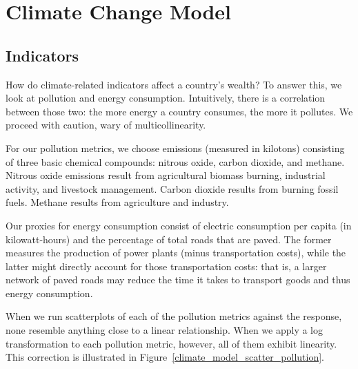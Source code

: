\documentclass[12pt]{article}
\begin{document}
\section{Climate Change Model}

\subsection{Indicators}
How do climate-related indicators affect a country's wealth? To answer this, we look at pollution and energy consumption. Intuitively, there is a correlation between those two: the more energy a country consumes, the more it pollutes. We proceed with caution, wary of multicollinearity.

For our pollution metrics, we choose emissions (measured in kilotons) consisting of three basic chemical compounds: nitrous oxide, carbon dioxide, and methane. Nitrous oxide emissions result from agricultural biomass burning, industrial activity, and livestock management. Carbon dioxide results from burning fossil fuels. Methane results from agriculture and industry.

Our proxies for energy consumption consist of electric consumption per capita (in kilowatt-hours) and the percentage of total roads that are paved. The former measures the production of power plants (minus transportation costs), while the latter might directly account for those transportation costs: that is, a larger network of paved roads may reduce the time it takes to transport goods and thus energy consumption.

When we run scatterplots of each of the pollution metrics against the response, none resemble anything close to a linear relationship. When we apply a log transformation to each pollution metric, however, all of them exhibit linearity. This correction is illustrated in Figure~\ref{climate_model_scatter_pollution}.
\end{document}
